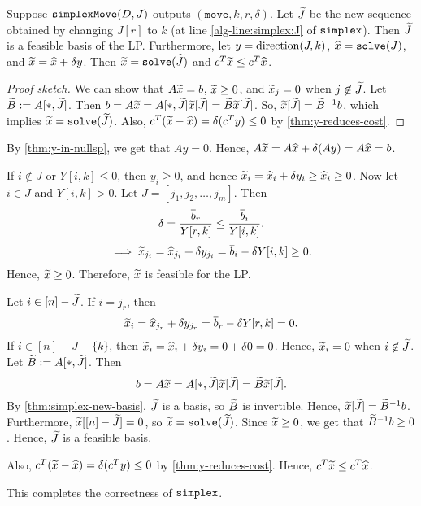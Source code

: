 \begin{lemma}
\label{thm:simplex-feasible-basis}
Suppose $\operatorname{\mathtt{simplexMove}}(D, J)$ outputs $(\mathtt{move}, k, r, \delta)$.
Let $\widetilde{J}$ be the new sequence obtained by changing $J[r]$ to $k$
(at line \ref{alg-line:simplex:J} of $\operatorname{\mathtt{simplex}}$).
Then $\widetilde{J}$ is a feasible basis of the LP.
Furthermore, let $y = \operatorname{direction}(J, k)$, $\widehat{x} = \operatorname{\mathtt{solve}}(J)$, and $\widetilde{x} = \widehat{x} + \delta y$.
Then $\widetilde{x} = \operatorname{\mathtt{solve}}(\widetilde{J})$ and $c^T\widetilde{x} \le c^T\widehat{x}$.
\end{lemma}
\begin{proof}[Proof sketch]
We can show that $A\widetilde{x} = b$, $\widetilde{x} \ge 0$, and $\widetilde{x}_j = 0$ when $j \not\in \widetilde{J}$.
Let $\widetilde{B} := A[*,\widetilde{J}]$. Then
$b = A\widetilde{x} = A[*,\widetilde{J}]\widetilde{x}[\widetilde{J}] = \widetilde{B}\widetilde{x}[\widetilde{J}]$.
So, $\widetilde{x}[\widetilde{J}] = \widetilde{B}^{-1}b$, which implies $\widetilde{x} = \operatorname{\mathtt{solve}}(\widetilde{J})$.
Also, $c^T(\widetilde{x} - \widehat{x}) = \delta(c^Ty) \le 0$ by \cref{thm:y-reduces-cost}.
\end{proof}
\begin{longProof}
By \cref{thm:y-in-nullsp}, we get that $Ay = 0$.
Hence, $A\widetilde{x} = A\widehat{x} + \delta (Ay) = A\widehat{x} = b$.

If $i \not\in J$ or $Y[i, k] \le 0$, then $y_i \ge 0$,
and hence $\widetilde{x}_i = \widehat{x}_i + \delta y_i \ge \widehat{x}_i \ge 0$.
Now let $i \in J$ and $Y[i,k] > 0$.
Let $J = [j_1, j_2, \ldots, j_m]$. Then
\[ \delta = \frac{\overline{b}_r}{Y[r,k]} \le \frac{\overline{b}_i}{Y[i, k]}. \]
\[ \implies \widetilde{x}_{j_i} = \widehat{x}_{j_i} + \delta y_{j_i} = \overline{b}_i - \delta Y[i,k] \ge 0. \]
Hence, $\widetilde{x} \ge 0$. Therefore, $\widetilde{x}$ is feasible for the LP.

Let $i \in [n] - \widetilde{J}$. If $i = j_r$, then
\[ \widetilde{x}_i = \widehat{x}_{j_r} + \delta y_{j_r} = \overline{b}_r - \delta Y[r,k] = 0. \]
If $i \in [n] - J - \{k\}$, then $\widetilde{x}_i = \widehat{x}_i + \delta y_i = 0 + \delta 0 = 0$.
Hence, $\widetilde{x}_i = 0$ when $i \not\in \widetilde{J}$.
Let $\widetilde{B} := A[*,\widetilde{J}]$. Then
\[ b = A\widetilde{x} = A[*,\widetilde{J}]\widetilde{x}[\widetilde{J}] = \widetilde{B}\widetilde{x}[\widetilde{J}]. \]
By \cref{thm:simplex-new-basis}, $\widetilde{J}$ is a basis, so $\widetilde{B}$ is invertible.
Hence, $\widetilde{x}[\widetilde{J}] = \widetilde{B}^{-1}b$.
Furthermore, $\widetilde{x}[[n] - \widetilde{J}] = 0$, so $\widetilde{x} = \operatorname{\mathtt{solve}}(\widetilde{J})$.
Since $\widetilde{x} \ge 0$, we get that $\widetilde{B}^{-1}b \ge 0$.
Hence, $\widetilde{J}$ is a feasible basis.

Also, $c^T(\widetilde{x} - \widehat{x}) = \delta(c^Ty) \le 0$ by \cref{thm:y-reduces-cost}.
Hence, $c^T\widetilde{x} \le c^T\widehat{x}$.
\end{longProof}

This completes the correctness of $\operatorname{\mathtt{simplex}}$.

